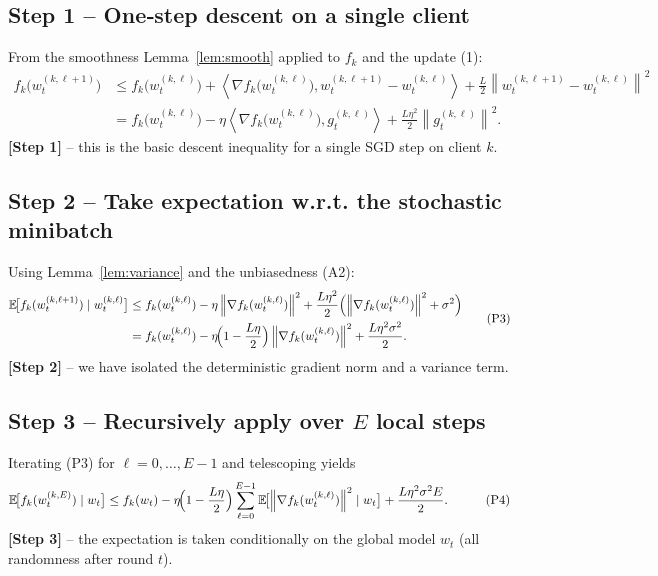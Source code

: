 \documentclass{article}
\newcommand{\E}{\mathbb{E}}
\newcommand{\norm}[1]{\left\lVert #1\right\rVert}
\newcommand{\ip}[2]{\left\langle #1,#2\right\rangle}
\begin{document}
\subsection*{Step 1 – One‑step descent on a single client}
From the smoothness Lemma~\ref{lem:smooth} applied to $f_k$ and the update (1):
\[
\begin{aligned}
f_k\!\bigl(w_{t}^{(k,\ell+1)}\bigr)
&\le f_k\!\bigl(w_{t}^{(k,\ell)}\bigr)
   + \ip{\nabla f_k\!\bigl(w_{t}^{(k,\ell)}\bigr)}{w_{t}^{(k,\ell+1)}-w_{t}^{(k,\ell)}}
   + \frac{L}{2}\norm{w_{t}^{(k,\ell+1)}-w_{t}^{(k,\ell)}}^2  \\
&= f_k\!\bigl(w_{t}^{(k,\ell)}\bigr)
   - \eta \ip{\nabla f_k\!\bigl(w_{t}^{(k,\ell)}\bigr)}{g_{t}^{(k,\ell)}}
   + \frac{L\eta^{2}}{2}\norm{g_{t}^{(k,\ell)}}^{2}.
\end{aligned}
\tag{P2}
\]
\textbf{[Step 1]} – this is the basic descent inequality for a single SGD step on client $k$.

\subsection*{Step 2 – Take expectation w.r.t. the stochastic minibatch}
Using Lemma~\ref{lem:variance} and the unbiasedness (A2):
\[
\begin{aligned}
\E\!\bigl[f_k(w_{t}^{(k,\ell+1)})\mid w_{t}^{(k,\ell)}\bigr]
&\le f_k(w_{t}^{(k,\ell)}) 
   - \eta \norm{\nabla f_k(w_{t}^{(k,\ell)})}^{2}
   + \frac{L\eta^{2}}{2}\Bigl(\norm{\nabla f_k(w_{t}^{(k,\ell)})}^{2} + \sigma^{2}\Bigr)   \\
&= f_k(w_{t}^{(k,\ell)}) 
   - \eta\!\Bigl(1-\frac{L\eta}{2}\Bigr)\norm{\nabla f_k(w_{t}^{(k,\ell)})}^{2}
   + \frac{L\eta^{2}\sigma^{2}}{2}.
\end{aligned}
\tag{P3}
\]
\textbf{[Step 2]} – we have isolated the deterministic gradient norm and a variance term.

\subsection*{Step 3 – Recursively apply over $E$ local steps}
Iterating (P3) for $\ell=0,\dots,E-1$ and telescoping yields
\[
\begin{aligned}
\E\!\bigl[f_k(w_{t}^{(k,E)})\mid w_t\bigr]
&\le f_k(w_t) 
   - \eta\!\Bigl(1-\frac{L\eta}{2}\Bigr)\sum_{\ell=0}^{E-1}
        \E\!\bigl[\norm{\nabla f_k(w_{t}^{(k,\ell)})}^{2}\mid w_t\bigr]
   + \frac{L\eta^{2}\sigma^{2}E}{2}.
\end{aligned}
\tag{P4}
\]
\textbf{[Step 3]} – the expectation is taken conditionally on the global model $w_t$ (all randomness after round $t$).
\end{document}
